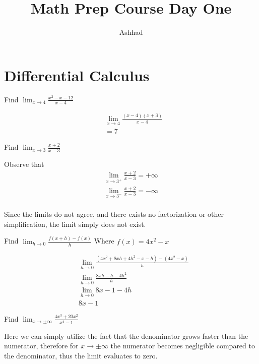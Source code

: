 \documentclass[a4paper]{article}
\title{Math Prep Course Day One}
\author{Ashhad}
\begin{document}
\maketitle

\section{Differential Calculus}

\begin{question}
	Find \(\lim_{x \to 4} \frac{x^2-x-12}{x-4}\)
\end{question}

\begin{align*}
	&\lim_{x \to 4} \frac{(x-4)(x+3)}{x-4} \\
	&=7
\end{align*}

\begin{question}
	Find \(\lim_{x \to 3} \frac{x+2}{x-3}\)
\end{question}

Observe that
\begin{align*}
	\lim_{x \to 3^+} \frac{x+2}{x-3} = +\infty \\
	\lim_{x \to 3^-} \frac{x+2}{x-3} = -\infty \\
\end{align*}

Since the limits do not agree, and there exists no factorization or other simplification, the limit simply does not exist.

\begin{question}
	Find \(\lim_{h \to 0} \frac{f(x+h)- f(x)}{h}\) Where \(f(x) = 4x^2-x\)
\end{question}

\begin{align*}
	&\lim_{h \to 0} \frac{(4x^2 + 8xh + 4h^2 - x - h) - (4x^2 -x)}{h} \\
	&\lim_{h \to 0} \frac{8xh - h - 4h^2}{h} \\
	&\lim_{h \to 0} 8x - 1 - 4h \\
	&8x -1
\end{align*}

\begin{question}
	Find \(\lim_{x \to \pm \infty} \frac{4x^3+20x^2}{x^4-1}\)
\end{question}

Here we can simply utilize the fact that the denominator grows faster than the numerator, therefore for \(x \to \pm \infty\) the numerator becomes negligible compared to the denominator, thus the limit evaluates to zero.
\end{document}
